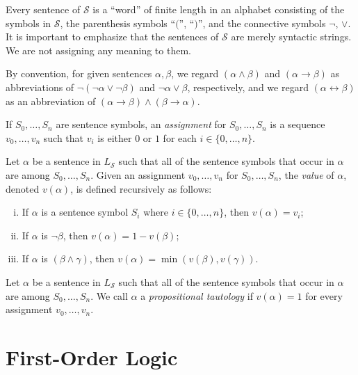 \documentclass{scrartcl}
\begin{document}
Every sentence of $\mathscr{S}$ is a ``word'' of finite length in an alphabet consisting of the symbols in $\mathscr{S}$, the parenthesis symbols ``$($'', ``$)$'', and the connective symbols $\neg$, $\lor$. It is important to emphasize that the sentences of $\mathscr{S}$ are merely syntactic strings. We are not assigning any meaning to them.

By convention, for given sentences $\alpha,\beta$, we regard $(\alpha\land\beta)$ and $(\alpha\to\beta)$ as abbreviations of $\neg(\neg\alpha\lor\neg\beta)$ and $\neg\alpha\lor\beta$, respectively, and we regard $(\alpha\leftrightarrow\beta)$ as an abbreviation of $(\alpha\to\beta)\land (\beta\to\alpha)$.



\begin{definition}

If $S_0,\dots,S_n$ are sentence symbols, an \emph{assignment} for $S_0,\dots,S_n$ is a sequence $v_0,\dots,v_n$ such that $v_i$ is either $0$ or $1$ for each $i\in \{0,\dots,n\}$.

Let $\alpha$ be a sentence in $L_\mathscr{S}$ such that all of the sentence symbols that occur in $\alpha$ are among $S_0,\dots,S_n$.  Given an assignment $v_0,\dots,v_n$ for $S_0,\dots,S_n$, the \emph{value} of $\alpha$, denoted $v(\alpha)$, is defined recursively as follows:

\begin{enumerate}[i)]
\item If $\alpha$ is a sentence symbol $S_i$ where $i\in\{0,\dots,n\}$, then $v(\alpha) = v_i$;
\item If $\alpha$ is $\neg \beta$,  then $v(\alpha) = 1 - v(\beta)$;
\item If $\alpha$ is $(\beta \wedge \gamma)$, then $v(\alpha) = \min(v(\beta), v(\gamma))$.
\end{enumerate}
\end{definition}

\begin{definition}
\label{D:propositional tautology}
Let $\alpha$ be a sentence in $L_\mathscr{S}$ such that all of the sentence symbols that occur in $\alpha$ are among $S_0,\dots,S_n$. We call $\alpha$ a \emph{propositional tautology} if $v(\alpha) = 1$ for every assignment $v_0,\dots, v_n$.
\end{definition}


\section{First-Order Logic}
\label{S:Logic}
\end{document}
